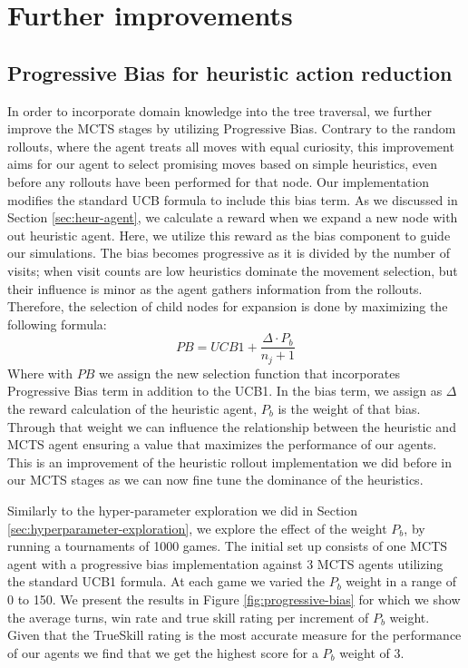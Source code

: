 \documentclass[12pt,a4paper]{article}
\begin{document}
\section{Further improvements}
\subsection{Progressive Bias for heuristic action reduction}

In order to incorporate domain knowledge into the tree traversal, we further improve the MCTS stages by utilizing Progressive Bias. Contrary to the random rollouts, where the agent treats all moves with equal curiosity, this improvement aims for our agent to select promising moves based on simple heuristics, even before any rollouts have been performed for that node. Our implementation modifies the standard UCB formula to include this bias term. As we discussed in Section \ref{sec:heur-agent}, we calculate a reward when we expand a new node with out heuristic agent. Here, we utilize this reward as the bias component to guide our simulations. The bias becomes progressive as it is divided by the number of visits; when visit counts are low heuristics dominate the movement selection, but their influence is minor as the agent gathers information from the rollouts. Therefore, the selection of child nodes for expansion is done by maximizing the following formula:
\begin{equation}
    PB = UCB1 + \frac{\Delta \cdot P_b}{n_j+1}
\end{equation}
Where with $PB$ we assign the new selection function that incorporates Progressive Bias term in addition to the UCB1. In the bias term, we assign as $\Delta$ the reward calculation of the heuristic agent, $P_b$ is the weight of that bias. Through that weight we can influence the relationship between the heuristic and MCTS agent ensuring a value that maximizes the performance of our agents. This is an improvement of the heuristic rollout implementation we did before in our MCTS stages as we can now fine tune the dominance of the heuristics. 

Similarly to the hyper-parameter exploration we did in Section \ref{sec:hyperparameter-exploration}, we explore the effect of the weight $P_b$, by running a tournaments of 1000 games. The initial set up consists of one MCTS agent with a progressive bias implementation against 3 MCTS agents utilizing the standard UCB1 formula. At each game we varied the $P_b$ weight in a range of 0 to 150. We present the results in Figure \ref{fig:progressive-bias} for which we show the average turns, win rate and true skill rating per increment of $P_b$ weight. Given that the TrueSkill rating is the most accurate measure for the performance of our agents we find that we get the highest score for a $P_b$ weight of 3. 
\end{document}
